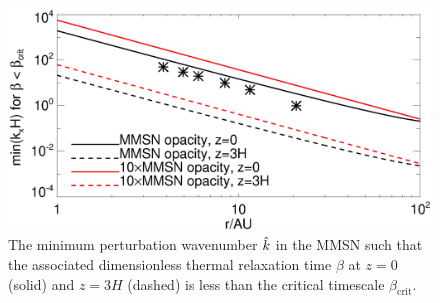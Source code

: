 %  
% 
%
%

\begin{figure}
  \includegraphics[width=\linewidth]{figures/bcrit_mink} 
  \caption{The minimum perturbation wavenumber $\hat{k}$ in
    the MMSN such that the associated dimensionless thermal
    relaxation time $\beta$ at $z=0$ (solid) and $z=3H$ (dashed) is
    less than the critical timescale $\beta_\mathrm{crit}$.   
    \label{mmsn_bcrit_bcool_mink}}   
\end{figure}  

